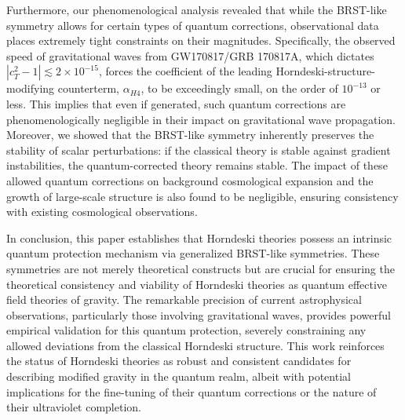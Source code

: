 \documentclass[twocolumn]{aastex631}
\begin{document}
Furthermore, our phenomenological analysis revealed that while the BRST-like symmetry allows for certain types of quantum corrections, observational data places extremely tight constraints on their magnitudes. Specifically, the observed speed of gravitational waves from GW170817/GRB 170817A, which dictates $ |c_T^2 - 1| \lesssim 2 \times 10^{-15} $, forces the coefficient of the leading Horndeski-structure-modifying counterterm, $ \alpha_{H4} $, to be exceedingly small, on the order of $ 10^{-13} $ or less. This implies that even if generated, such quantum corrections are phenomenologically negligible in their impact on gravitational wave propagation. Moreover, we showed that the BRST-like symmetry inherently preserves the stability of scalar perturbations: if the classical theory is stable against gradient instabilities, the quantum-corrected theory remains stable. The impact of these allowed quantum corrections on background cosmological expansion and the growth of large-scale structure is also found to be negligible, ensuring consistency with existing cosmological observations.

In conclusion, this paper establishes that Horndeski theories possess an intrinsic quantum protection mechanism via generalized BRST-like symmetries. These symmetries are not merely theoretical constructs but are crucial for ensuring the theoretical consistency and viability of Horndeski theories as quantum effective field theories of gravity. The remarkable precision of current astrophysical observations, particularly those involving gravitational waves, provides powerful empirical validation for this quantum protection, severely constraining any allowed deviations from the classical Horndeski structure. This work reinforces the status of Horndeski theories as robust and consistent candidates for describing modified gravity in the quantum realm, albeit with potential implications for the fine-tuning of their quantum corrections or the nature of their ultraviolet completion.

{}

\end{document}
